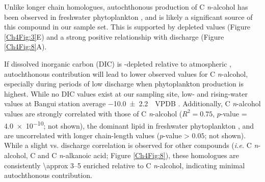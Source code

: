 Unlike longer chain homologues, autochthonous production of C \textit{n}-alcohol has been observed in freshwater phytoplankton \citep{Volkman:1998tk,Volkman:1999tq,Xu:2007jk}, and is likely a significant source of this compound in our sample set. This is supported by depleted  values (Figure \ref{Ch4Fig:3}E) and a strong positive relationship with discharge (Figure \ref{Ch4Fig:8}A). 

If dissolved inorganic carbon (DIC) is -depleted relative to atmospheric , autochthonous contribution will lead to lower observed  values for C \textit{n}-alcohol, especially during periods of low discharge when phytoplankton production is highest. While no DIC  values exist at our sampling site, low- and rising-water values at Bangui station average \SI{-10.0 \pm 2.2}{\permil.VPDB} \citep[$n = 30$;][]{Bouillon:2012cw,Bouillon:2014ko}.  Additionally, C \textit{n}-alcohol  values are strongly correlated with those of C \textit{n}-alcohol ($R^2 = 0.75$, $p$-value = \num{4.0e-10}; not shown), the dominant lipid in freshwater phytoplankton \citep{Volkman:1998tk,Volkman:1999tq,Xu:2007jk}, and are uncorrelated with longer chain-length values ($p$-value > $0.05$; not shown). While a slight  vs. discharge correlation is observed for other compounds (\textit{i.e.} C \textit{n}-alcohol, C and C \textit{n}-alkanoic acid; Figure \ref{Ch4Fig:8}), these homologues are consistently \SIrange{\approx 3}{5}{\permil} enriched relative to C \textit{n}-alcohol, indicating minimal autochthonous contribution.

